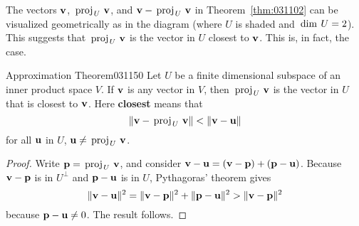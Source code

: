 \begin{wrapfigure}[4]{l}{5cm} 
\vspace*{-2em}
\centering

\end{wrapfigure}

The vectors $\textbf{v}$, $\thinspace\operatorname{proj\medspace}_{\!U}\,{\textbf{v}}$, and $\textbf{v} - \thinspace\operatorname{proj\medspace}_{\!U}\,{\textbf{v}}$ in Theorem~\ref{thm:031102} can be visualized geometrically as in the diagram (where $U$ is shaded and $\thinspace\operatorname{dim\medspace} U = 2$). This suggests that $\thinspace\operatorname{proj\medspace}_{\!U}\,{\textbf{v}}$ is the vector in $U$ closest to $\textbf{v}$. This is, in fact, the case.
\vspace{1em}

\begin{theorem}{Approximation Theorem}{031150}
Let $U$ be a finite dimensional subspace of an inner product space $V$. If $\textbf{v}$ is any vector in $V$, then $\thinspace\operatorname{proj\medspace}_{\!U}\,{\textbf{v}}$ is the vector in $U$ that is closest to $\textbf{v}$. Here \textbf{closest} means that
\begin{equation*}
\| \textbf{v} - \thinspace\operatorname{proj\medspace}_{\!U}\,{\textbf{v}} \| < \| \textbf{v} - \textbf{u} \|
\end{equation*}
for all $\textbf{u}$ in $U$, $\textbf{u} \neq \thinspace\operatorname{proj\medspace}_{\!U}\,{\textbf{v}}$.
\end{theorem}

\begin{proof}
Write $\textbf{p} = \thinspace\operatorname{proj\medspace}_{\!U}\,{\textbf{v}}$, and consider $\textbf{v} - \textbf{u} = (\textbf{v} - \textbf{p}) + (\textbf{p} - \textbf{u})$. Because $\textbf{v} - \textbf{p}$ is in $U^{\perp}$ and $\textbf{p} - \textbf{u}$ is in $U$, Pythagoras' theorem gives
\begin{equation*}
\| \textbf{v} - \textbf{u} \| ^2 = 
\| \textbf{v} - \textbf{p} \| ^2 + 
\| \textbf{p} - \textbf{u} \| ^2 > 
\| \textbf{v} - \textbf{p} \| ^2
\end{equation*}
because $\textbf{p} - \textbf{u} \neq 0$. The result follows.
\end{proof}

